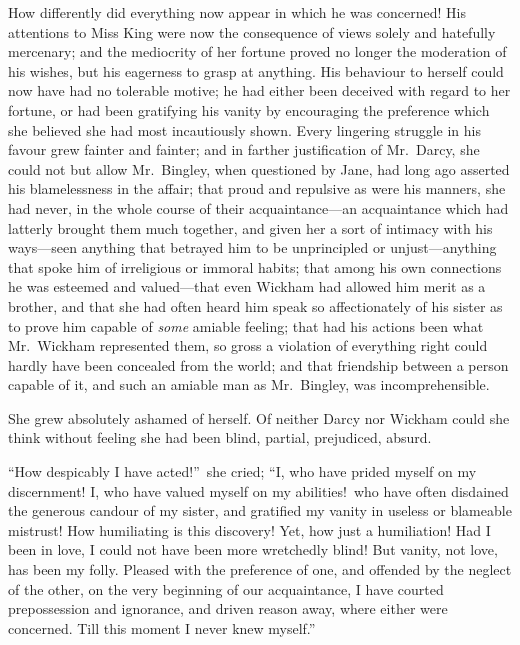 \documentclass[12pt,english,oneside]{book}
\begin{document}
How differently did everything now appear in which he was concerned!
His attentions to Miss King were now the consequence of views solely
and hatefully mercenary; and the mediocrity of her fortune proved
no longer the moderation of his wishes, but his eagerness to grasp
at anything. His behaviour to herself could now have had no tolerable
motive; he had either been deceived with regard to her fortune, or
had been gratifying his vanity by encouraging the preference which
she believed she had most incautiously shown. Every lingering struggle
in his favour grew fainter and fainter; and in farther justification
of Mr.\ Darcy, she could not but allow Mr.\ Bingley, when questioned
by Jane, had long ago asserted his blamelessness in the affair; that
proud and repulsive as were his manners, she had never, in the whole
course of their acquaintance\mbox{---}an acquaintance which had latterly
brought them much together, and given her a sort of intimacy with
his ways\mbox{---}seen anything that betrayed him to be unprincipled
or unjust\mbox{---}anything that spoke him of irreligious or immoral
habits; that among his own connections he was esteemed and valued\mbox{---}that
even Wickham had allowed him merit as a brother, and that she had
often heard him speak so affectionately of his sister as to prove
him capable of \textit{some} amiable feeling; that had his actions
been what Mr.\ Wickham represented them, so gross a violation of
everything right could hardly have been concealed from the world;
and that friendship between a person capable of it, and such an amiable
man as Mr.\ Bingley, was incomprehensible.

She grew absolutely ashamed of herself. Of neither Darcy nor Wickham
could she think without feeling she had been blind, partial, prejudiced,
absurd.

{}``How despicably I have acted!''\ she cried; {}``I, who have
prided myself on my discernment! I, who have valued myself on my abilities!\ who
have often disdained the generous candour of my sister, and gratified
my vanity in useless or blameable mistrust! How humiliating is this
discovery! Yet, how just a humiliation! Had I been in love, I could
not have been more wretchedly blind! But vanity, not love, has been
my folly. Pleased with the preference of one, and offended by the
neglect of the other, on the very beginning of our acquaintance, I
have courted prepossession and ignorance, and driven reason away,
where either were concerned. Till this moment I never knew myself.''
\end{document}
